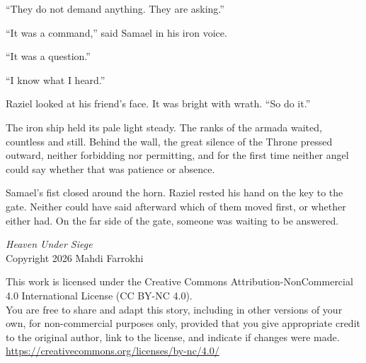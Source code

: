 \documentclass[11pt]{article}
\begin{document}
``They do not demand anything. They are asking.''

``It was a command,'' said Samael in his iron voice.

``It was a question.''

``I know what I heard.''

Raziel looked at his friend's face. It was bright with wrath. ``So do it.''

The iron ship held its pale light steady. The ranks of the armada waited, countless and still. Behind the wall, the great silence of the Throne pressed outward, neither forbidding nor permitting, and for the first time neither angel could say whether that was patience or absence.

Samael's fist closed around the horn. Raziel rested his hand on the key to the gate. Neither could have said afterward which of them moved first, or whether either had. On the far side of the gate, someone was waiting to be answered.

\clearpage
\vspace*{\fill}
\begin{center}
{\itshape Heaven Under Siege}\\[1\baselineskip]
Copyright \textcopyright{} 2026 Mahdi Farrokhi
\end{center}
\vspace{2\baselineskip}
\begin{center}
\begin{minipage}{0.85\textwidth}
\small\centering
This work is licensed under the Creative Commons Attribution-NonCommercial 4.0 International License (CC BY-NC 4.0).
\\[0.75\baselineskip]You are free to share and adapt this story, including in other versions of your own, for non-commercial purposes only, provided that you give appropriate credit to the original author, link to the license, and indicate if changes were made.\\[1\baselineskip]
\mbox{\url{https://creativecommons.org/licenses/by-nc/4.0/}}
\end{minipage}
\end{center}
\vspace*{\fill}
\end{document}

